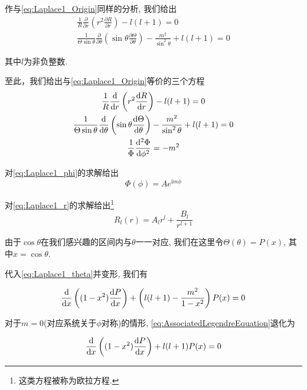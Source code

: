 作与\cref{eq:Laplace1_Origin}同样的分析, 我们给出
\begin{gather*}
    \frac{1}{R}\frac{\partial}{\partial r}\left( r^2\frac{\partial R}{\partial r} \right) - l(l+1)=0\\
    \frac{1}{\Theta\sin \theta}\frac{\partial}{\partial \theta}\left( \sin \theta \frac{\partial \Theta}{\partial \theta} \right) -\frac{m^2}{\sin^2 \theta} + l(l+1) = 0
\end{gather*}

其中$l$为非负整数.

至此，我们给出与\cref{eq:Laplace1_Origin}等价的三个方程
\begin{gather}
    \frac{1}{R}\frac{\mathrm{d}}{\mathrm{d} r}\left( r^2\frac{\mathrm{d} R}{\mathrm{d} r} \right) - l(l+1)=0\label{eq:Laplace1_r}\\
    \frac{1}{\Theta\sin \theta}\frac{\mathrm{d}}{\mathrm{d} \theta}\left( \sin \theta \frac{\mathrm{d} \Theta}{\mathrm{d} \theta} \right) -\frac{m^2}{\sin^2 \theta} + l(l+1) = 0\label{eq:Laplace1_theta}\\
    \frac{1}{\Phi}\frac{\mathrm{d} ^2\Phi}{\mathrm{d} \phi ^2}=-m^2\label{eq:Laplace1_phi}
\end{gather}

对\cref{eq:Laplace1_phi}的求解给出
\begin{equation}
    \Phi (\phi) = A e^{\mathrm{i}m\phi}
\end{equation}

对\cref{eq:Laplace1_r}的求解给出\footnote{这类方程被称为欧拉方程.}
\begin{equation}
    R_l(r) = A_l r^l+\frac{B_l}{r^{l+1}}
\end{equation}

由于$\cos \theta$在我们感兴趣的区间内与$\theta$一一对应, 我们在这里令$\Theta(\theta) = P(x)$, 其中$x=\cos \theta$.

代入\cref{eq:Laplace1_theta}并变形, 我们有

\begin{definition}[连带勒让德方程]
    \begin{equation}
        \frac{\mathrm{d}}{\mathrm{d} x}\left((1-x^2)\frac{\mathrm{d} P}{\mathrm{d} x}\right)+\left(l(l+1)-\frac{m^2}{1-x^2}\right)P(x)=0 \label{eq:AssociatedLegendreEquation}
    \end{equation}
\end{definition}

对于$m=0$(对应系统关于$\phi$对称)的情形, \cref{eq:AssociatedLegendreEquation}退化为

\begin{definition}[勒让德方程]
    \begin{equation}
        \frac{\mathrm{d}}{\mathrm{d} x}\left((1-x^2)\frac{\mathrm{d} P}{\mathrm{d} x}\right)+l(l+1)P(x)=0\label{eq:LegendreEquation}
    \end{equation}
\end{definition}

